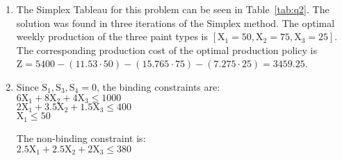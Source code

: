 \begin{enumerate}

\item 
The Simplex Tableau for this problem can be seen in Table~\ref{tab:q2}. The solution was found in three iterations of the Simplex method. The optimal weekly production of the three paint types is $[\text{X}_1 = 50, \text{X}_2 = 75, \text{X}_3 = 25]$. The corresponding production cost of the optimal production policy is $\text{Z} = 5400 - (11.53 \cdot 50) - (15.765 \cdot 75) - (7.275 \cdot 25) = 3459.25$.

\item
Since $\text{S}_1, \text{S}_3, \text{S}_4 = 0$, the binding constraints are:\\
$6\text{X}_1 + 8\text{X}_2 + 4\text{X}_3 \leq 1000$ \\
$2\text{X}_1 + 3.5\text{X}_2 + 1.5\text{X}_3 \leq 400 $ \\
$\text{X}_1 \leq 50$

The non-binding constraint is:\\
$2.5\text{X}_1 + 2.5\text{X}_2 + 2\text{X}_3 \leq 380$
	
\end{enumerate}

